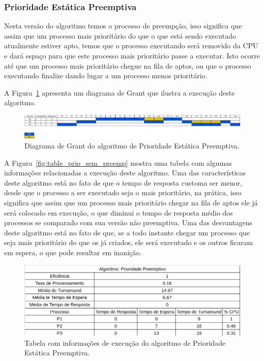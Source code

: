 \documentclass[
	12pt,				%
	oneside,   	        %
	a4paper,			%
	english,			%
	french,				%
	spanish,			%
	brazil,				%
	]{pacotes/abntex2}
\begin{document}
\subsubsection{Prioridade Estática Preemptiva}
\label{subsubsec:prio_preemp}

Nesta versão do algoritmo temos o processo de preempção, isso significa que assim que um processo mais prioritário do que o que está sendo executado atualmente estiver apto, temos que o processo executando será removido da CPU e dará espaço para que este processo mais prioritário passe a executar. Isto ocorre até que um processo mais prioritário chegue na fila de aptos, ou que o processo executando finalize dando lugar a um processo menos prioritário.

 A Figura~\ref{fig:prio_preemp} apresenta um diagrama de Grant que ilustra a execução deste algoritmo.

\begin{figure}[H]
  \centering
  \includegraphics[scale=0.20]{figuras/ex2/prio_preemp.png}
  \caption{Diagrama de Grant do algoritmo de Prioridade Estática Preemptiva.}
  \label{fig:prio_preemp}
\end{figure}

A Figura~\ref{fig:table_prio_sem_preemp} mostra uma tabela com algumas informações relacionadas a execução deste algoritmo. Uma das características deste algoritmo está no fato de que o tempo de resposta customa ser menor, desde que o processo a ser executado seja o mais prioritário, na prática, isso significa que assim que um processo mais prioritário chegar na fila de aptos ele já será colocado em execução, o que diminui o tempo de resposta médio dos processos se comparado com sua versão não preemptiva. Uma das desvantagens deste algoritmo está no fato de que, se a todo instante chegar um processo que seja mais prioritário do que os já criados, ele será executado e os outros ficaram em espera, o que pode resultar em inanição.

\begin{figure}[H]
  \centering
  \includegraphics[scale=0.5]{figuras/ex2/table_prio_preemp.png}
  \caption{Tabela com informações de execução do algoritmo de Prioridade Estática Preemptiva.}
  \label{fig:table_prio_preemp}
\end{figure}
\end{document}
